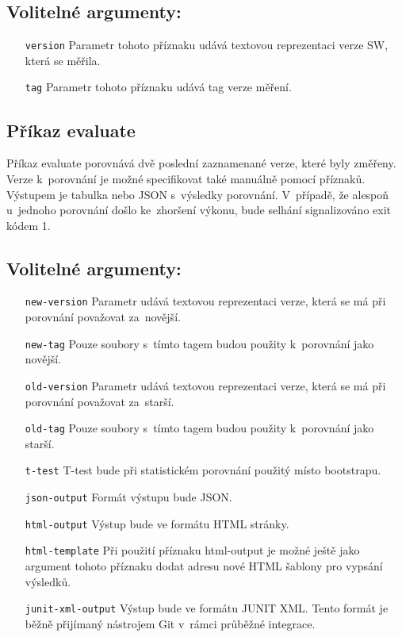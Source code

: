 \subsection*{Volitelné argumenty:}
\begin{itemize}[label=\texttt{\textbf{\textendash}}]
    \item[\texttt{version}] Parametr tohoto příznaku udává textovou reprezentaci verze SW, která se měřila.
    \item[\texttt{tag}] Parametr tohoto příznaku udává tag verze měření.
\end{itemize}

\subsection{Příkaz evaluate}

Příkaz evaluate porovnává dvě poslední zaznamenané verze, které byly změřeny.
Verze k~porovnání je možné specifikovat také manuálně pomocí příznaků. Výstupem
je tabulka nebo JSON s~výsledky porovnání. V~případě, že alespoň u~jednoho porovnání
došlo ke~zhoršení výkonu, bude selhání signalizováno exit kódem 1.

\subsection*{Volitelné argumenty:}
\begin{itemize}[label=\texttt{\textbf{\textendash}}]
    \item[\texttt{new-version}] Parametr udává textovou reprezentaci verze, která se má při porovnání považovat za~novější.
    \item[\texttt{new-tag}]     Pouze soubory s~tímto tagem budou použity k~porovnání jako novější.
    \item[\texttt{old-version}] Parametr udává textovou reprezentaci verze, která se má při porovnání považovat za~starší.
    \item[\texttt{old-tag}]     Pouze soubory s~tímto tagem budou použity k~porovnání jako starší.
    \item[\texttt{t-test}]      T-test bude při statistickém porovnání použitý místo bootstrapu.
    \item[\texttt{json-output}] Formát výstupu bude JSON.
    \item[\texttt{html-output}] Výstup bude ve formátu HTML stránky.
    \item[\texttt{html-template}] Při použití příznaku html-output je možné ještě jako argument tohoto příznaku dodat adresu nové HTML šablony pro vypsání výsledků.
    \item[\texttt{junit-xml-output}] Výstup bude ve formátu JUNIT XML. Tento formát je běžně přijímaný nástrojem Git v~rámci průběžné integrace.
\end{itemize}

